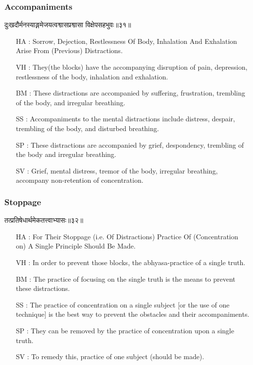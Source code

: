\begin{frame}[fragile]\frametitle{Accompaniments}
\begin{sanskrit}
दुःखदौर्मनस्याङ्गमेजयत्वश्वासप्रश्वासा विक्षेपसहभुवः॥३१॥
\end{sanskrit}

	\begin{itemize}
	\item [HA]: Sorrow, Dejection, Restlessness Of Body, Inhalation And Exhalation Arise From (Previous) Distractions.
	\item [VH]: They(the blocks) have the accompanying disruption of pain, depression, restlessness of the body, inhalation and exhalation.
	\item [BM]: These distractions are accompanied by suffering, frustration, trembling of the body, and irregular breathing.
	\item [SS]: Accompaniments to the mental distractions include distress, despair, trembling of the body, and disturbed breathing.
	\item [SP]: These distractions are accompanied by grief, despondency, trembling of the body and irregular breathing.
	\item [SV]: Grief, mental distress, tremor of the body, irregular breathing, accompany non-retention of concentration. 
	\end{itemize}
\end{frame}



\begin{frame}[fragile]\frametitle{Stoppage}
\begin{sanskrit}
तत्प्रतिषेधार्थमेकतत्त्वाभ्यासः॥३२॥
\end{sanskrit}

	\begin{itemize}
	\item [HA]: For Their Stoppage (i.e. Of Distractions) Practice Of (Concentration on) A Single Principle Should Be Made.
	\item [VH]: In order to prevent those blocks, the abhyasa-practice of a single truth.
	\item [BM]: The practice of focusing on the single truth is the means to prevent these distractions.
	\item [SS]: The practice of concentration on a single subject [or the use of one technique] is the best way to prevent the obstacles and their accompaniments.
	\item [SP]: They can be removed by the practice of concentration upon a single truth.
	\item [SV]: To remedy this, practice of one subject (should be made). 
	\end{itemize}
\end{frame}



